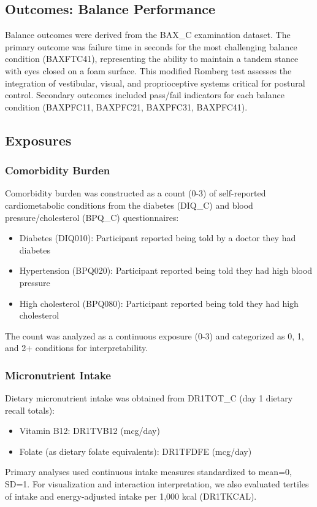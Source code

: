 \documentclass[11pt,a4paper]{article}
\begin{document}
\subsection{Outcomes: Balance Performance}

Balance outcomes were derived from the BAX\_C examination dataset. The primary outcome was failure time in seconds for the most challenging balance condition (BAXFTC41), representing the ability to maintain a tandem stance with eyes closed on a foam surface. This modified Romberg test assesses the integration of vestibular, visual, and proprioceptive systems critical for postural control. Secondary outcomes included pass/fail indicators for each balance condition (BAXPFC11, BAXPFC21, BAXPFC31, BAXPFC41).

\subsection{Exposures}

\subsubsection{Comorbidity Burden}

Comorbidity burden was constructed as a count (0-3) of self-reported cardiometabolic conditions from the diabetes (DIQ\_C) and blood pressure/cholesterol (BPQ\_C) questionnaires:
\begin{itemize}
    \item Diabetes (DIQ010): Participant reported being told by a doctor they had diabetes
    \item Hypertension (BPQ020): Participant reported being told they had high blood pressure
    \item High cholesterol (BPQ080): Participant reported being told they had high cholesterol
\end{itemize}
The count was analyzed as a continuous exposure (0-3) and categorized as 0, 1, and 2+ conditions for interpretability.

\subsubsection{Micronutrient Intake}

Dietary micronutrient intake was obtained from DR1TOT\_C (day 1 dietary recall totals):
\begin{itemize}
    \item Vitamin B12: DR1TVB12 (mcg/day)
    \item Folate (as dietary folate equivalents): DR1TFDFE (mcg/day)
\end{itemize}
Primary analyses used continuous intake measures standardized to mean=0, SD=1. For visualization and interaction interpretation, we also evaluated tertiles of intake and energy-adjusted intake per 1,000 kcal (DR1TKCAL).
\end{document}
